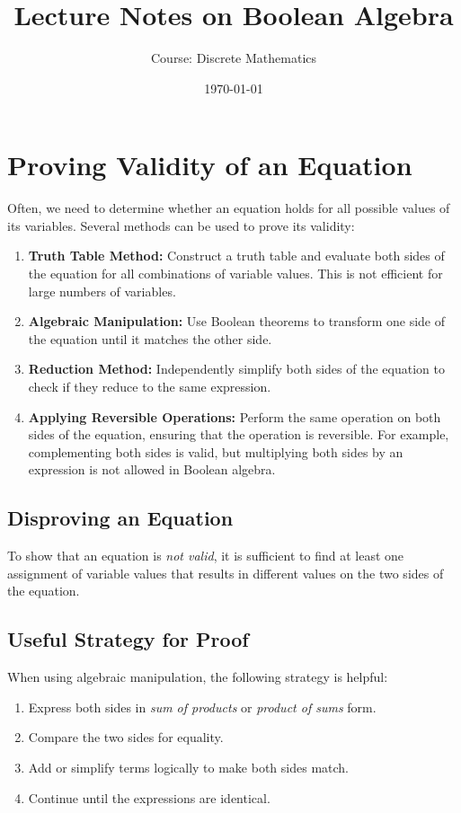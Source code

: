 \documentclass{article}
\title{Lecture Notes on Boolean Algebra}
\author{Course: Discrete Mathematics}
\date{\today}
\begin{document}
\maketitle
\setcounter{section}{3}
\section{Proving Validity of an Equation}

Often, we need to determine whether an equation holds for all possible values of its variables. Several methods can be used to prove its validity:

\begin{enumerate}
    \item \textbf{Truth Table Method:} Construct a truth table and evaluate both sides of the equation for all combinations of variable values. This is not efficient for large numbers of variables.
    \item \textbf{Algebraic Manipulation:} Use Boolean theorems to transform one side of the equation until it matches the other side.
    \item \textbf{Reduction Method:} Independently simplify both sides of the equation to check if they reduce to the same expression.
    \item \textbf{Applying Reversible Operations:} Perform the same operation on both sides of the equation, ensuring that the operation is reversible. For example, complementing both sides is valid, but multiplying both sides by an expression is not allowed in Boolean algebra.
\end{enumerate}

\subsection{Disproving an Equation}
To show that an equation is \textit{not valid}, it is sufficient to find at least one assignment of variable values that results in different values on the two sides of the equation.

\subsection{Useful Strategy for Proof}
When using algebraic manipulation, the following strategy is helpful:

\begin{enumerate}
    \item Express both sides in \textit{sum of products} or \textit{product of sums} form.
    \item Compare the two sides for equality.
    \item Add or simplify terms logically to make both sides match.
    \item Continue until the expressions are identical.
\end{enumerate}
\end{document}

